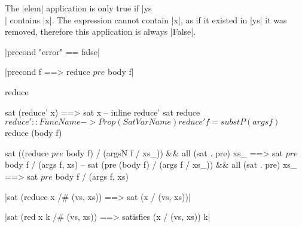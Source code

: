 The |elem| application is only true if |ys \\ [x]| contains |x|. The expression cannot contain |x|, as if it existed in |ys| it was removed, therefore this application is always |False|.


{|precond "error" == false|}


{|precond f ==> reduce $ pre $ body f|}



\begin{code}
reduce

sat (reduce' x) ==> sat x
    -- inline reduce'
sat reduce $
reduce' :: FuncName -> Prop (Sat VarName)
reduce' f = substP (args f) $ reduce (body f)




sat ((reduce $ pre $ body f) / (argsN f / xs_)) && all (sat . pre) xs_ ==> sat $ pre $ body f / (args f, xs)
    -- 
sat (pre (body f) / (args f / xs_)) && all (sat . pre) xs_ ==> sat $ pre $ body f / (args f, xs)
\end{code}






{|sat (reduce x /# (vs, xs)) ==> sat (x / (vs, xs))|}




{|sat (red x k /# (vs, xs)) ==> satisfies (x / (vs, xs)) k|}


